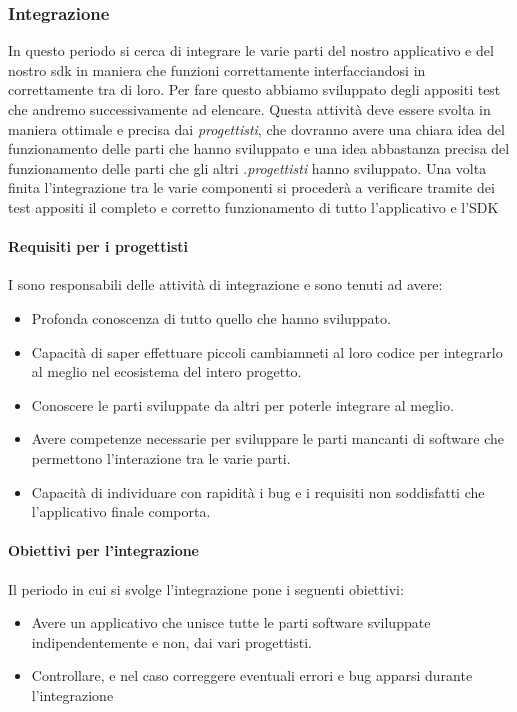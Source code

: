 \subsubsection{Integrazione}
In questo periodo si cerca di integrare le varie parti del nostro applicativo e del nostro sdk in maniera che funzioni correttamente interfacciandosi in  correttamente tra di loro. Per fare questo abbiamo sviluppato degli appositi test che andremo successivamente ad elencare.
Questa attività deve essere svolta in maniera ottimale e precisa dai \textit{progettisti}, che dovranno avere una chiara idea del funzionamento delle parti che hanno sviluppato e una idea abbastanza precisa del funzionamento delle parti che gli altri .\textit{progettisti} hanno sviluppato. Una volta finita l'integrazione tra le varie componenti si procederà a verificare tramite dei test appositi il completo e corretto funzionamento di tutto l'applicativo e l'SDK

\paragraph{Requisiti per i progettisti}
I \textit{\ProgP} sono responsabili delle attività di integrazione e sono tenuti ad avere:
\begin{itemize}
\item
Profonda conoscenza di tutto quello che hanno sviluppato.
\item
Capacità di saper effettuare piccoli cambiamneti al loro codice per integrarlo al meglio nel ecosistema del intero progetto.
\item
Conoscere le parti sviluppate da altri per poterle integrare al meglio.
\item
Avere competenze necessarie per sviluppare le parti mancanti di software che permettono l'interazione tra le varie parti.
\item
Capacità di individuare con rapidità i bug e i requisiti non soddisfatti che l'applicativo finale comporta.
\end{itemize}

\paragraph{Obiettivi per l'integrazione}
Il periodo in cui si svolge l'integrazione pone i seguenti obiettivi:
\begin{itemize}
\item Avere un applicativo che unisce tutte le parti software sviluppate indipendentemente e non, dai vari progettisti.
\item Controllare, e nel caso correggere eventuali errori e bug apparsi durante l'integrazione
\end{itemize}

